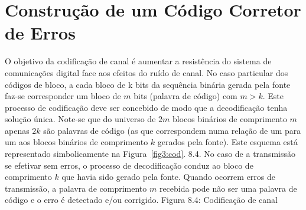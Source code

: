 \section{Construção de um Código Corretor de Erros}




O objetivo da codificação de canal é aumentar a resistência do sistema de comunicações digital face aos efeitos do ruído de canal. No caso particular dos códigos de bloco, a cada bloco de k bits da sequência binária gerada pela fonte faz-se corresponder um bloco de $m$ bits (palavra de código) com $m > k$. Este processo de codificação deve ser concebido de modo que a decodificação tenha solução única. Note-se que do universo de $2m$ blocos binários de comprimento $m$ apenas $2k$ são palavras de código (as que correspondem numa relação de um para um aos blocos binários de comprimento $k$ gerados pela fonte). Este esquema está representado simbolicamente na Figura~\ref{fig3:cod}. 8.4. No caso de a transmissão se efetivar sem erros, o processo de decodificação conduz ao bloco de comprimento $k$ que havia sido gerado pela fonte. Quando ocorrem erros de transmissão, a palavra de comprimento $m$ recebida pode não ser uma palavra de código e o erro é detectado e/ou corrigido.
Figura 8.4: Codificação de canal


